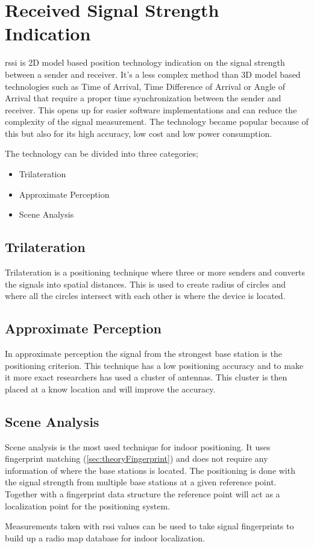 \section{Received Signal Strength Indication}\label{sec:theoryRssi}
\acrfull{rssi} is 2D model based position technology indication on the signal
strength between a sender and receiver.  It's a less complex method than 3D
model based technologies such as Time of Arrival, Time Difference of Arrival or
Angle of Arrival that require a proper time synchronization between the sender
and receiver.  This opens up for easier software implementations and can reduce
the complexity of the signal measurement.  The technology became popular because
of this but also for its high accuracy, low cost and low power consumption.
\cite{IndoorFingerprintPositioning2017} 

\bigskip

The technology can be divided into three categories; \begin{itemize} \item
Trilateration \item Approximate Perception \item Scene Analysis
\cite{IndoorFingerprintPositioning2017} \end{itemize}

\subsection{Trilateration}\label{sec:theoryRssiTrilateration} Trilateration
is a positioning technique where three or more senders and converts the signals
into spatial distances.  This is used to create radius of circles and where all
the circles intersect with each other is where the device is located.
\cite{IndoorFingerprintPositioning2017} 

\subsection{Approximate Perception}\label{sec:theoryRssiApproxPerception} In
approximate perception the signal from the strongest base station is the
positioning criterion.  This technique has a low positioning accuracy and to
make it more exact researchers has used a cluster of antennas.  This cluster is
then placed at a know location and will improve the
accuracy.\cite{IndoorFingerprintPositioning2017} 

\subsection{Scene Analysis}\label{sec:theoryRssiSceneAnalysis} Scene analysis
is the most used technique for indoor positioning.  It uses fingerprint matching
(\cref{sec:theoryFingerprint}) and does not require any information of where the
base stations is located.  The positioning is done with the signal strength from
multiple base stations at a given reference point.  Together with a fingerprint
data structure the reference point will act as a localization point for the
positioning system.\cite{IndoorFingerprintPositioning2017} 

\bigskip

Measurements taken with \acrshort{rssi} values can be used to take signal
fingerprints to build up a radio map database for indoor
localization.\cite{DevelopmentMobileIndoor2017} 
